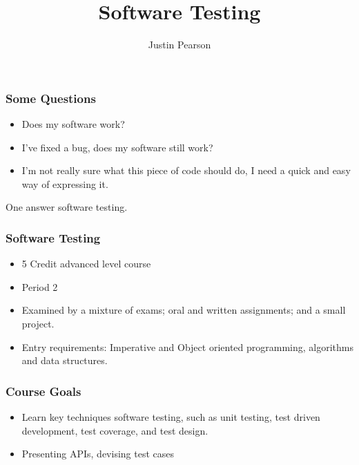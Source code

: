 \documentclass{beamer}
\begin{document}
\title{Software Testing}
\author{Justin Pearson}
\date{}
\begin{frame}
\maketitle
  
\end{frame}
\begin{frame}
  \frametitle{Some Questions}
  \begin{itemize}
  \item Does my software work?
  \item I've fixed a bug, does my software still work?
  \item I'm not really sure what this piece of code should do, I need
    a quick and easy way of expressing it.
  \end{itemize}
  One answer software testing.
\end{frame}
\begin{frame}
  \frametitle{Software Testing}
  \begin{itemize}
  \item 5 Credit advanced level course
  \item Period 2
  \item Examined by a mixture of exams; oral and written
    assignments;  and a small project.
  \item Entry requirements: Imperative and Object oriented
    programming, algorithms and data structures. %
  \end{itemize}
\end{frame}
\begin{frame}
  \frametitle{Course Goals}
  \begin{itemize}
  \item Learn key techniques  software testing, such as unit testing,
    test driven development, test coverage,  and test design.
  \item Presenting APIs, devising test cases 
  \end{itemize}
\end{frame}
\end{document}
